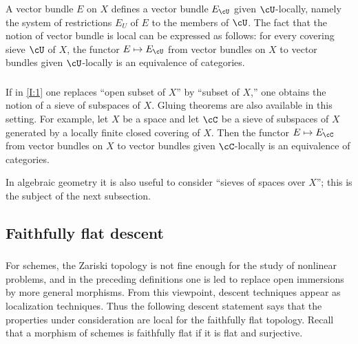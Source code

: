 \documentclass[12pt,oneside,english]{smfbook}
\begin{document}
\subsubsection{}\label{I:1-3-3}

A vector bundle $E$ on $X$ defines a vector bundle $E_\cU$ given $\cU$-locally, namely the system of restrictions $E_U$ of $E$ to the members of $\cU$. The fact that the notion of vector bundle is local can be expressed as follows: for every covering sieve $\cU$ of $X$, the functor $E\mapsto E_\cU$ from vector bundles on $X$ to vector bundles given $\cU$-locally is an equivalence of categories.

\subsubsection{}\label{I:1-3-4}

If in \ref{I:1} one replaces ``open subset of $X$'' by ``subset of $X$,'' one obtains the notion of a sieve of subspaces of $X$. Gluing theorems are also available in this setting. For example, let $X$ be a space and let $\cC$ be a sieve of subspaces of $X$ generated by a locally finite closed covering of $X$. Then the functor $E\mapsto E_\cC$ from vector bundles on $X$ to vector bundles given $\cC$-locally is an equivalence of categories.

In algebraic geometry it is also useful to consider ``sieves of spaces over $X$''; this is the subject of the next subsection.

\subsection{Faithfully flat descent}\label{I:1-4}

\subsubsection{}\label{I:1-4-1}

For schemes, the Zariski topology is not fine enough for the study of nonlinear problems, and in the preceding definitions one is led to replace open immersions by more general morphisms. From this viewpoint, descent techniques appear as localization techniques. Thus the following descent statement says that the properties under consideration are local for the faithfully flat topology. Recall that a morphism of schemes is faithfully flat if it is flat and surjective.
\end{document}

